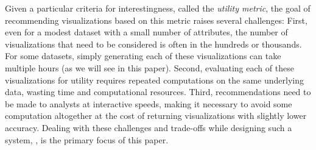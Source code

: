 
Given a particular criteria for interestingness, called the {\em utility metric},
the goal of recommending visualizations based on this metric 
raises several challenges:
First, even for a modest dataset with a small number
of attributes, the number of  
visualizations that need to be considered is often in the hundreds or thousands.
For some datasets, simply generating each of these visualizations can take multiple hours 
(as we will see in this paper).
Second, evaluating each of these visualizations for utility requires repeated
computations on the same underlying data, wasting time and computational resources.
Third, recommendations need to be made to analysts at interactive speeds,
making it necessary to avoid some computation altogether at the cost
of returning visualizations with slightly lower accuracy. 
Dealing with these challenges and trade-offs while designing such a system, \SeeDB, 
is the primary focus of this paper. 






